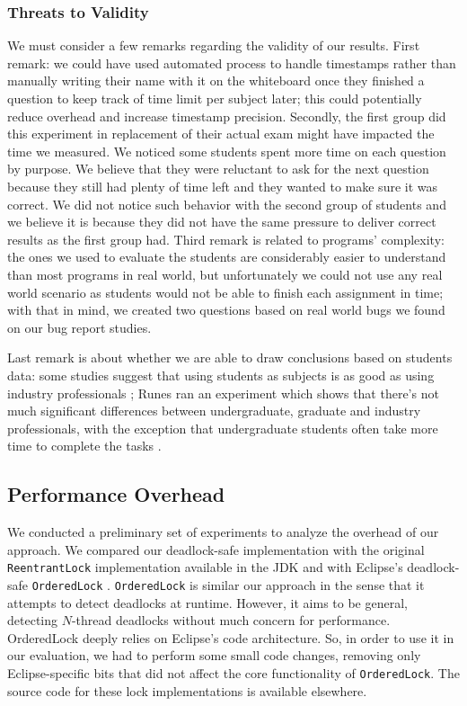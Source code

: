 \subsubsection{Threats to Validity}

We must consider a few remarks regarding the validity of our results. First remark: we could have used automated process to handle timestamps rather than manually writing their name with it on the whiteboard once they finished a question to keep track of time limit per subject later; this could potentially reduce overhead and increase timestamp precision.
Secondly, the first group did this experiment in replacement of their actual exam might have impacted the time we measured. We noticed some students spent more time on each question by purpose. We believe that they were reluctant to ask for the next question because they still had plenty of time left and they wanted to make sure it was correct. We did not notice such behavior with the second group of students and we believe it is because they did not have the same pressure to deliver correct results as the first group had.
Third remark is related to programs' complexity: the ones we used to evaluate the students are considerably easier to understand than most programs in real world, but unfortunately we could not use any real world scenario as students would not be able to finish each assignment in time; with that in mind, we created two questions based on real world bugs we found on our bug report studies.

Last remark is about whether we are able to draw conclusions based on students data: some studies suggest that using students as subjects is as good as using industry professionals \cite{staron}; Runes ran an experiment which shows that there's not much significant differences between undergraduate, graduate and industry professionals, with the exception that undergraduate students often take more time to complete the tasks \cite{runes}.

\subsection{Performance Overhead}\label{sec:perf}

We conducted a preliminary set of experiments to analyze the overhead of our approach. We compared our deadlock-safe implementation with the original {\tt ReentrantLock} implementation available in the JDK and with Eclipse's deadlock-safe {\tt OrderedLock} \cite{orderedlock}. {\tt OrderedLock} is similar our approach in the sense that it attempts to detect deadlocks at runtime. However, it aims to be general, detecting $N$-thread deadlocks without much concern for performance. 
OrderedLock deeply relies on Eclipse's code architecture. So, in order to use it in our evaluation, we had to perform some small code changes, removing only Eclipse-specific bits that did not affect the core functionality of {\tt OrderedLock}. The source code for these lock implementations is available elsewhere\cite{repo}.

